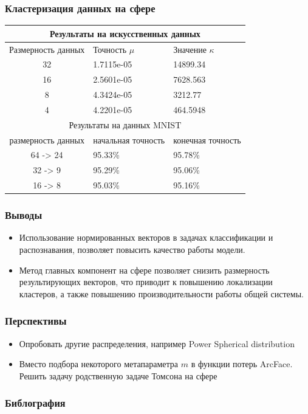 \documentclass{beamer}
\begin{document}
\begin{frame}
\frametitle{Кластеризация данных на сфере}
\begin{tabular}{|c|l|l|} 
\hline
\multicolumn{3}{|c|}{Результаты на искусственных данных} \\
\hline
Размерность данных & Точность $\mu$ & Значение $\kappa$  \\ 
\hline
32 & 1.7115e-05 & 14899.34 \\
16 & 2.5601e-05 & 7628.563 \\
8  & 4.3424e-05 &  3212.77 \\
4  & 4.2201e-05 & 464.5948 \\
\hline
\multicolumn{3}{|c|}{Результаты на данных $\mathrm{MNIST}$} \\
\hline
размерность данных & начальная точность & конечная точность \\
\hline
64 -> 24 & 95.33\% & 95.78\% \\
32 -> 9  & 95.29\% & 95.06\% \\
16 -> 8  & 95.03\% & 95.16\% \\
\hline
\end{tabular}
\end{frame}

\begin{frame}
\frametitle{Выводы}
\begin{itemize}
\item Использование нормированных векторов в задачах классификации и распознавания, позволяет повысить качество работы модели.
\item Метод главных компонент на сфере позволяет снизить размерность результирующих векторов, что приводит к повышению локализации кластеров, а также повышению производительности работы общей системы.
\end{itemize}
\end{frame}

\begin{frame}
\frametitle{Перспективы}
\begin{itemize}
\item Опробовать другие распределения, например Power Spherical distribution \cite{decao2020power}
\item Вместо подбора некоторого метапараметра $m$ в функции потерь ArcFace. Решить задачу родственную задаче Томсона на сфере
\end{itemize}
\end{frame}

\begin{frame}[allowframebreaks]
\frametitle{Библография}


\end{frame}


\end{document}

